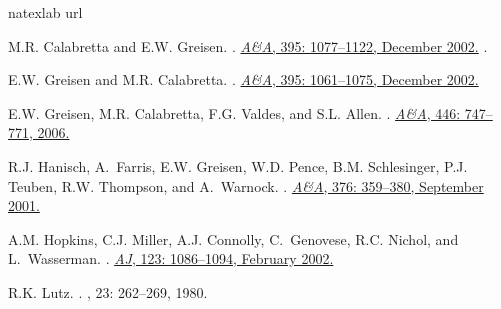 \begin{thebibliography}{12}
\expandafter\ifx\csname natexlab\endcsname\relax\def\natexlab#1{#1}\fi
\expandafter\ifx\csname url\endcsname\relax
  \def\url#1{{\tt #1}}\fi

M.R. {Calabretta} and E.W. {Greisen}.
.
\newblock
\href{http://adsabs.harvard.edu/cgi-bin/nph-bib_query?bibcode=2002A%26A...395%.1077C&db_key=AST}%
{{\em A\&A}, 395: 1077--1122, December 2002.}
.

E.W. {Greisen} and M.R. {Calabretta}.
.
\newblock
\href{http://adsabs.harvard.edu/cgi-bin/nph-bib_query?bibcode=2002A%26A...395%.1061G&db_key=AST}%
{{\em A\&A}, 395: 1061--1075, December 2002.}

E.W. {Greisen}, M.R. {Calabretta}, F.G. Valdes, and S.L. Allen.
.
\newblock 
\href{http://adsabs.harvard.edu/abs/2006A%26A...446..747G}{\emph{A\&A}, 446:\penalty0 747--771, 2006.}

R.J. {Hanisch}, A.~{Farris}, E.W. {Greisen}, W.D. {Pence}, B.M. {Schlesinger},
  P.J. {Teuben}, R.W. {Thompson}, and A.~{Warnock}.
.
\newblock 
\href{http://adsabs.harvard.edu/cgi-bin/nph-bib_query?bibcode=2001A%
..359H&db_key=AST}%
{{\em A\&A}, 376: 359--380, September 2001.}

A.M. {Hopkins}, C.J. {Miller}, A.J. {Connolly}, C.~{Genovese}, R.C. {Nichol},
  and L.~{Wasserman}.
.
\newblock 
\href{http://adsabs.harvard.edu/cgi-bin/nph-bib_query?bibcode=2002AJ....123.1%
086H&db_key=AST}%
{{\em AJ}, 123: 1086--1094, February 2002.}

R.K. Lutz.
.
, 23: 262--269, 1980.


\end{thebibliography}
